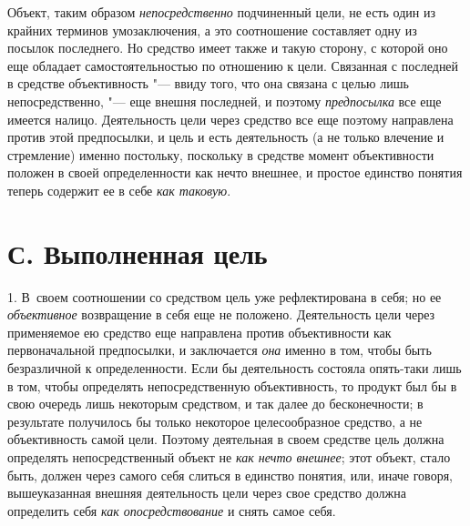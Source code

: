 {{Объект, таким образом
{\em непосредственно}
подчиненный цели, не есть один из крайних терминов
умозаключения, а это соотношение составляет одну из посылок последнего. Но
средство имеет также и такую сторону, с которой оно еще обладает
самостоятельностью по отношению к цели. Связанная с последней в средстве
объективность "--- ввиду того, что она связана с целью лишь
непосредственно, "--- еще внешня последней, и поэтому
{\em предпосылка} все еще
имеется налицо. Деятельность цели через средство все еще поэтому направлена
против этой предпосылки, и цель и есть деятельность (а не только влечение и
стремление) именно постольку, поскольку в средстве момент объективности
положен в своей определенности как нечто внешнее, и простое единство
понятия теперь содержит ее в себе
{\em как таковую}.

\section[С. Выполненная цель]{С. Выполненная цель }
1. В~своем соотношении со средством цель уже рефлектирована в
себя; но ее {\em объективное}
возвращение в себя еще не положено. Деятельность цели через
применяемое ею средство еще направлена против объективности как
первоначальной предпосылки, и заключается
{\em она} именно в том,
чтобы быть безразличной к определенности. Если бы деятельность состояла
опять-таки лишь в том, чтобы определять непосредственную объективность, то
продукт был бы в свою очередь лишь некоторым средством, и так далее до
бесконечности; в результате получилось бы только некоторое целесообразное
средство, а не объективность самой цели. Поэтому деятельная в своем
средстве цель должна определять непосредственный объект не
{\em как нечто внешнее};
этот объект, стало быть, должен через самого себя слиться в
единство понятия, или, иначе говоря, вышеуказанная внешняя деятельность
цели через свое средство должна определить себя
{\em как опосредствование}
и снять самое себя.

}}
